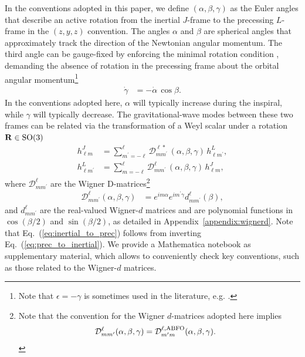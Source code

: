 \documentclass[%
aps,
prd,
amssymb,
amsmath,
amsfonts,
eqsecnum,
showpacs,
nofootinbib,
floatfix,
twocolumn,
twoside,
a4paper,
superscriptaddress
]{revtex4-1}
\newcommand{\mpr}{m^{\prime}}
\newcommand{\nl}{\newline}
\begin{document}
In the conventions adopted in this paper, we define $(\alpha, \beta, \gamma)$ as the Euler angles that describe an active rotation from the inertial $J$-frame to the precessing $L$-frame in the $(z,y,z)$ convention. 
The angles $\alpha$ and $\beta$ are spherical angles that approximately track the direction of the Newtonian angular momentum. The third angle can be gauge-fixed by enforcing the minimal rotation condition \cite{Boyle:2011gg}, demanding the absence of rotation in the precessing frame about the orbital angular momentum\footnote{Note that $\epsilon = - \gamma$ is sometimes used in the literature, e.g. \cite{Bohe:PPv2}.}
\begin{align}\label{eq:minimal_rotation}
    \dot{\gamma} &= - \dot{\alpha} \, \cos \beta .
\end{align}
In the conventions adopted here, $\alpha$ will typically increase during the inspiral, while $\gamma$ will typically decrease. The gravitational-wave modes between these two frames can be related via the transformation of a Weyl scalar under a rotation ${\bf{R}} \in \rm{SO}(3)$ \cite{Goldberg:1966uu,Schmidt:2010it}
\begin{align}
\label{eq:prec_to_inertial}
    h^J_{\ell m} &= \displaystyle\sum_{m^{\prime} = - \ell}^{\ell} \mathcal{D}^{\ell \ast}_{m m^{\prime}} \, (\alpha, \beta, \gamma) \, h^L_{\ell m^{\prime}} , \\
     h^L_{\ell m^{\prime}} &= \displaystyle\sum_{m = - \ell}^{\ell} \mathcal{D}^{\ell}_{m m^{\prime}} \, (\alpha, \beta, \gamma) \, h^J_{\ell m}, 
    \label{eq:inertial_to_prec}
\end{align}
where $\mathcal{D}^{\ell}_{m \mpr}$ are the Wigner D-matrices\footnote{Note that the convention for the Wigner $d$-matrices adopted here implies \cite{Marsat:2018oam,Arun:2008kb}
\begin{align*}
   \mathcal{D}^{\ell}_{m m^{\prime}} (\alpha, \beta, \gamma) &=  \mathcal{D}^{\ell , \rm{ABFO}}_{m^{\prime} m} (\alpha, \beta, \gamma)  .
\end{align*}
}
\begin{align}
\label{eq:wignerD_matrices}
    \mathcal{D}_{m \mpr}^{\ell}(\alpha, \beta, \gamma) &= e^{i m \alpha} e^{i \mpr \gamma} d_{m \mpr}^{\ell}(\beta),
\end{align}
and $d^{\ell}_{m \mpr}$ are the real-valued Wigner-$d$ matrices and are polynomial functions in $\cos (\beta / 2)$ and $\sin (\beta / 2)$, as detailed in Appendix~\ref{appendix:wignerd}.  Note that Eq.~(\ref{eq:inertial_to_prec})
follows from inverting Eq.~(\ref{eq:prec_to_inertial}).
We provide a Mathematica \cite{Mathematica} notebook as supplementary material, which allows to conveniently check key conventions, such as those related to the
Wigner-$d$ matrices.
\end{document}
